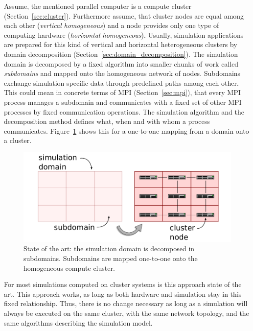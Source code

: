Assume, the mentioned parallel computer is a compute cluster
(Section~\ref{sec:cluster}). Furthermore assume, that cluster nodes
are equal among each other (\emph{vertical homogeneous}) and a node
provides only one type of computing hardware (\emph{horizontal
  homogeneous}). Usually, simulation applications are prepared for
this kind of vertical and horizontal heterogeneous clusters by domain
decomposition (Section~\ref{sec:domain_decomposition}). The simulation
domain is decomposed by a fixed algorithm into smaller chunks of work
called \emph{subdomains} and mapped onto the homogeneous network of
nodes. Subdomains exchange simulation specific data through predefined
paths among each other. This could mean in concrete terms of MPI
(Section~\ref{sec:mpi}), that every MPI process manages a subdomain and
communicates with a fixed set of other MPI processes by fixed
communication operations. The simulation algorithm and the
decomposition method defines what, when and with whom a process
communicates.  Figure~\ref{fig:state_of_the_art} shows this for a
one-to-one mapping from a domain onto a cluster.

\begin{figure}[H]
  \centering \includegraphics[width=\textwidth]{graphics/30_state_of_the_art}
  \caption{State of the art: the simulation domain is decomposed in
    subdomains. Subdomains are mapped one-to-one onto the homogeneous
    compute cluster.}
  \label{fig:state_of_the_art}
\end{figure}

For most simulations computed on cluster systems is this approach
state of the art.  This approach works, as long as both hardware and
simulation stay in this fixed relationship. Thus, there is no change
necessary as long as a simulation will always be executed on the same
cluster, with the same network topology, and the same algorithms
describing the simulation model.

